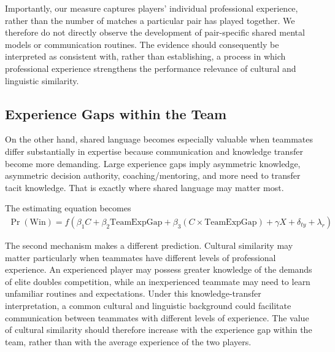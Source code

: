 \documentclass[10pt]{article}
\begin{document}
Importantly, our measure captures players' individual professional experience, rather than the number of matches a particular pair has played together. We therefore do not directly observe the development of pair-specific shared mental models or communication routines. The evidence should consequently be interpreted as consistent with, rather than establishing, a process in which professional experience strengthens the performance relevance of cultural and linguistic similarity.


\subsection{Experience Gaps within the Team} 

On the other hand, shared language becomes especially valuable when teammates differ substantially in expertise because communication and knowledge transfer become more demanding. Large experience gaps imply asymmetric knowledge, asymmetric decision authority, coaching/mentoring,
 and more need to transfer tacit knowledge. That is exactly where shared language may matter most. 

The estimating equation becomes
\begin{align}
\operatorname{Pr}(\text{Win}) = f(\beta_1 C + \beta_2 \text{TeamExpGap} + \beta_3 (C \times \text{TeamExpGap}) + \gamma X + \delta_{ty} + \lambda_r)
\end{align}




The second mechanism makes a different prediction. Cultural similarity may matter particularly when teammates have different levels of professional experience. An experienced player may possess greater knowledge of the demands of elite doubles competition, while an inexperienced teammate may need to learn unfamiliar routines and expectations. Under this knowledge-transfer interpretation, a common cultural and linguistic background could facilitate communication between teammates with different levels of experience. The value of cultural similarity should therefore increase with the experience gap within the team, rather than with the average experience of the two players.
\end{document}
